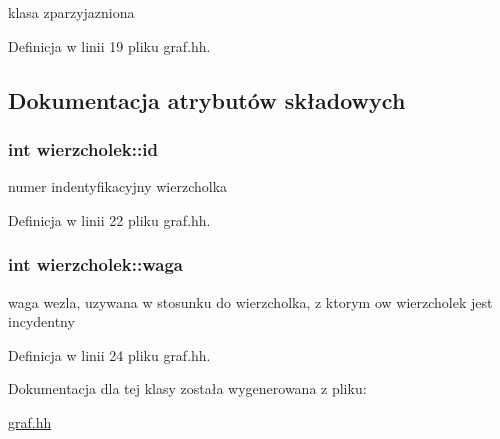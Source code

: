 klasa zparzyjazniona 



Definicja w linii 19 pliku graf.\-hh.



\subsection{Dokumentacja atrybutów składowych}
\hypertarget{classwierzcholek_ada68383887e4523b766e2c1e5ab6fa6e}{
\subsubsection[{id}]{\setlength{\rightskip}{0pt plus 5cm}int wierzcholek\-::id\hspace{0.3cm}{\ttfamily [private]}}}\label{classwierzcholek_ada68383887e4523b766e2c1e5ab6fa6e}


numer indentyfikacyjny wierzcholka 



Definicja w linii 22 pliku graf.\-hh.

\hypertarget{classwierzcholek_a3c53d7c09f6e83be8808bd78d6221e08}{
\subsubsection[{waga}]{\setlength{\rightskip}{0pt plus 5cm}int wierzcholek\-::waga\hspace{0.3cm}{\ttfamily [private]}}}\label{classwierzcholek_a3c53d7c09f6e83be8808bd78d6221e08}


waga wezla, uzywana w stosunku do wierzcholka, z ktorym ow wierzcholek jest incydentny 



Definicja w linii 24 pliku graf.\-hh.



Dokumentacja dla tej klasy została wygenerowana z pliku\-:\begin{DoxyCompactItemize}
\item 
\hyperlink{graf_8hh}{graf.\-hh}\end{DoxyCompactItemize}
